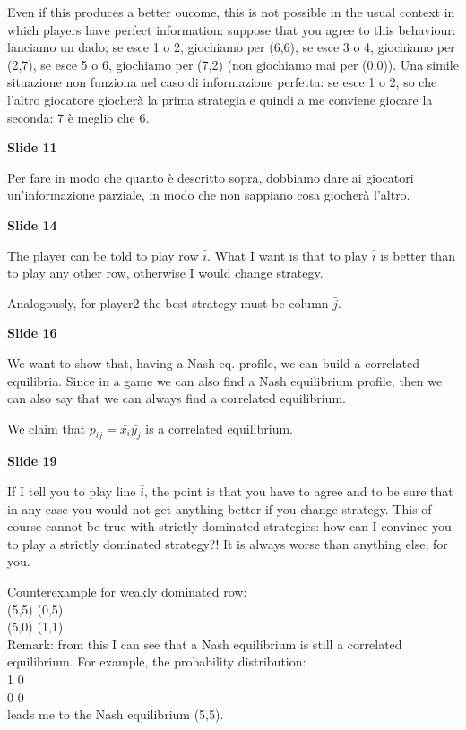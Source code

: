 \documentclass[pt11,a4paper,twoside,reqno,openright]{paper}
\begin{document}
\noindent Even if this produces a better oucome, this is not possible in 
the usual context in which players have perfect information: suppose that you 
agree to this behaviour: lanciamo un dado; se esce 1 o 2, giochiamo per (6,6), 
se esce 3 o 4, giochiamo per (2,7), se esce 5 o 6, giochiamo per (7,2) (non 
giochiamo mai per (0,0)). Una simile situazione non funziona nel caso di 
informazione perfetta: se esce 1 o 2, so che l'altro giocatore giocherà la 
prima strategia e quindi a me conviene giocare la seconda: 7 è meglio che 6.

\bigskip
\noindent \textbf{Slide 11}

\noindent Per fare in modo che quanto è descritto sopra, dobbiamo dare ai 
giocatori un'informazione parziale, in modo che non sappiano cosa giocherà 
l'altro.

\bigskip
\noindent \textbf{Slide 14}

\noindent The player can be told to play row $\bar{i}$. What I want is that 
to play $\bar{i}$ is better than to play any other row, otherwise I would 
change strategy.

\noindent Analogously, for player2 the best strategy must be column $\bar{j}$.

\bigskip
\noindent \textbf{Slide 16}

\noindent We want to show that, having a Nash eq. profile, we can build a 
correlated equilibria. Since in a game we can also find a Nash equilibrium 
profile, then we can also say that we can always find a correlated equilibrium. 

\noindent We claim that $p_{ij} = \bar{x_i}\bar{y_j}$ is a correlated 
equilibrium.

\bigskip
\noindent \textbf{Slide 19}

\noindent If I tell you to play line $\bar{i}$, the point is that you have to 
agree and to be sure that in any case you would not get anything better if 
you change strategy. This of course cannot be true with strictly dominated 
strategies: how can I convince you to play a strictly dominated strategy?! It 
is always worse than anything else, for you.

\noindent Counterexample for weakly dominated row:\\
(5,5)	(0,5)\\
(5,0)	(1,1)\\
Remark: from this I can see that a Nash equilibrium is still a correlated 
equilibrium. For example, the probability distribution:\\
1	0\\
0	0\\
leads me to the Nash equilibrium (5,5).
\end{document}
